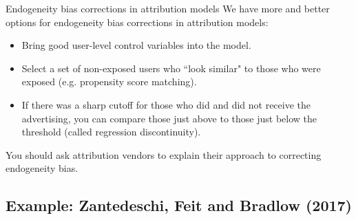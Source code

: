 \documentclass[10pt, aspectratio=169]{beamer}
\begin{document}
\begin{frame}{Endogeneity bias corrections in attribution models}
We have more and better options for endogeneity bias corrections in attribution models: 
\begin{itemize}
\item Bring good user-level control variables into the model. 
\item Select a set of non-exposed users who ``look similar" to those who were exposed (e.g. \alert{propensity score matching}). 
\item If there was a sharp cutoff for those who did and did not receive the advertising, you can compare those just above to those just below the threshold (called \alert{regression discontinuity}).
\end{itemize}
\alert{You should ask attribution vendors to explain their approach to correcting endogeneity bias.} 
\end{frame}

\subsection{Example: Zantedeschi, Feit and Bradlow (2017)}
\end{document}
